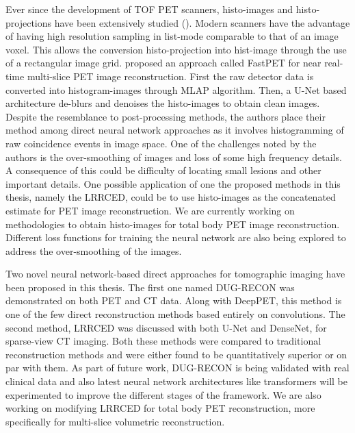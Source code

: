 Ever since the development of \ac{TOF} \ac{PET} scanners, histo-images and histo-projections have been extensively studied (\cite{snyder1981matheematical}). Modern scanners have the advantage of having high resolution sampling in list-mode comparable to that of an image voxel. This allows the conversion histo-projection into hist-image through the use of a rectangular image grid. \cite{whiteley2020fastpet} proposed an approach called FastPET for near real-time multi-slice \ac{PET} image reconstruction. First the raw detector data is converted into histogram-images through \ac{MLAP} algorithm. Then, a U-Net based architecture de-blurs and denoises the histo-images to obtain clean images. Despite the resemblance to post-processing methods, the authors place their method among direct neural network approaches as it involves histogramming of raw coincidence events in image space. One of the challenges noted by the authors is the over-smoothing of images and loss of some high frequency details. A consequence of this could be difficulty of locating small lesions and other important details. One possible application of one the proposed methods in this thesis, namely the \ac{LRRCED}, could be to use histo-images as the concatenated estimate for \ac{PET} image reconstruction. We are currently working on methodologies to obtain histo-images for total body PET image reconstruction. Different loss functions for training the neural network are also being explored to address the over-smoothing of the images.   

Two novel neural network-based direct approaches for tomographic imaging have been proposed in this thesis. The first one named DUG-RECON was demonstrated on both \ac{PET} and \ac{CT} data. Along with DeepPET, this method is one of the few direct reconstruction methods based entirely on convolutions. The second method, LRRCED was discussed with both U-Net and DenseNet, for sparse-view CT imaging. Both these methods were compared to traditional reconstruction methods and were either found to be quantitatively superior or on par with them. As part of future work, DUG-RECON is being validated with real clinical data and also latest neural network architectures like transformers will be experimented to improve the different stages of the framework. We are also working on modifying LRRCED for total body PET reconstruction, more specifically for multi-slice volumetric reconstruction. 



